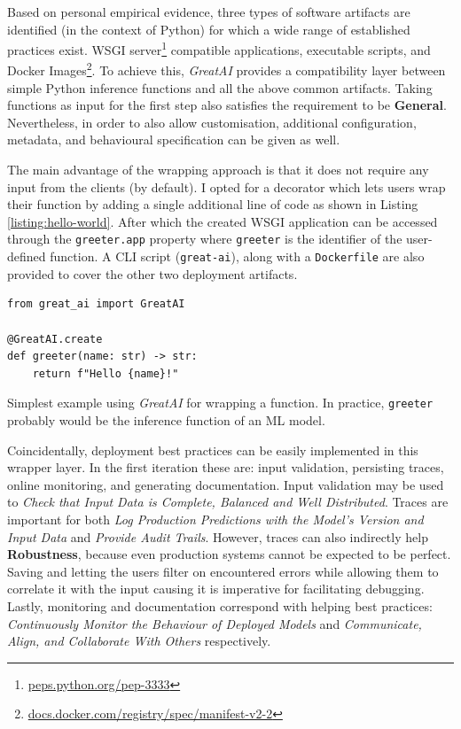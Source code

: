 Based on personal empirical evidence, three types of software artifacts are identified (in the context of Python) for which a wide range of established practices exist. WSGI server\footnote{\href{https://peps.python.org/pep-3333/}{peps.python.org/pep-3333}} compatible applications, executable scripts, and Docker Images\footnote{\href{https://docs.docker.com/registry/spec/manifest-v2-2/}{docs.docker.com/registry/spec/manifest-v2-2}}. To achieve this, \textit{GreatAI} provides a compatibility layer between simple Python inference functions and all the above common artifacts. Taking functions as input for the first step also satisfies the requirement to be \textbf{General}. Nevertheless, in order to also allow customisation, additional configuration, metadata, and behavioural specification can be given as well.

The main advantage of the wrapping approach is that it does not require any input from the clients (by default). I opted for a decorator \cite{gamma1995design} which lets users wrap their function by adding a single additional line of code as shown in Listing \ref{listing:hello-world}.  After which the created WSGI application can be accessed through the \texttt{greeter.app} property where \texttt{greeter} is the identifier of the user-defined function. A CLI script (\texttt{great-ai}), along with a \texttt{Dockerfile} are also provided to cover the other two deployment artifacts.

\begin{listing}[!ht]
\begin{verbatim}
from great_ai import GreatAI

@GreatAI.create
def greeter(name: str) -> str:
    return f"Hello {name}!"
\end{verbatim}
\captionsetup{width=.9\linewidth}
\caption{Simplest example using \textit{GreatAI} for wrapping a function. In practice, \texttt{greeter} probably would be the inference function of an ML model.}
\label{listing:hello-world}
\end{listing}

Coincidentally, deployment best practices can be easily implemented in this wrapper layer. In the first iteration these are: input validation, persisting traces, online monitoring, and generating documentation. Input validation may be used to \textit{Check that Input Data is Complete, Balanced and Well Distributed}. Traces are important for both \textit{Log Production Predictions with the Model's Version and Input Data} and \textit{Provide Audit Trails}. However, traces can also indirectly help \textbf{Robustness}, because even production systems cannot be expected to be perfect. Saving and letting the users filter on encountered errors while allowing them to correlate it with the input causing it is imperative for facilitating debugging. Lastly, monitoring and documentation correspond with helping best practices: \textit{Continuously Monitor the Behaviour of Deployed Models} and \textit{Communicate, Align, and Collaborate With Others} respectively.

